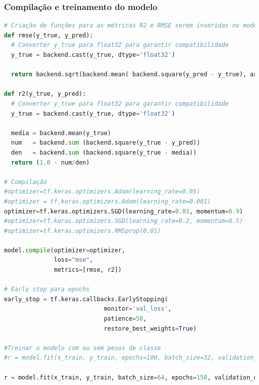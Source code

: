\subsubsection*{Compilação e treinamento do modelo}
\begin{lstlisting}[language=Python, style=input]
# Criação de funções para as métricas R2 e RMSE serem inseridas no modelo
def rmse(y_true, y_pred):
  # Converter y_true para float32 para garantir compatibilidade
  y_true = backend.cast(y_true, dtype='float32')

  return backend.sqrt(backend.mean( backend.square(y_pred - y_true), axis=-1) )

def r2(y_true, y_pred):
  # Converter y_true para float32 para garantir compatibilidade
  y_true = backend.cast(y_true, dtype='float32')

  media = backend.mean(y_true)
  num   = backend.sum (backend.square(y_true - y_pred))
  den   = backend.sum (backend.square(y_true - media))
  return (1.0 - num/den)

# Compilação
#optimizer=tf.keras.optimizers.Adam(learning_rate=0.05)
#optimizer = tf.keras.optimizers.Adam(learning_rate=0.001)
optimizer=tf.keras.optimizers.SGD(learning_rate=0.01, momentum=0.9)
#optimizer=tf.keras.optimizers.SGD(learning_rate=0.2, momentum=0.5)
#optimizer=tf.keras.optimizers.RMSprop(0.01)

model.compile(optimizer=optimizer,
              loss="mse",
              metrics=[rmse, r2])

# Early stop para epochs
early_stop = tf.keras.callbacks.EarlyStopping(
                            monitor='val_loss',
                            patience=50,
                            restore_best_weights=True)

#Treinar o modelo com ou sem pesos de classe
#r = model.fit(x_train, y_train, epochs=100, batch_size=32, validation_data=(x_test, y_test), callbacks=[early_stop])

r = model.fit(x_train, y_train, batch_size=64, epochs=150, validation_data=(x_test, y_test), callbacks=[early_stop])
\end{lstlisting}
